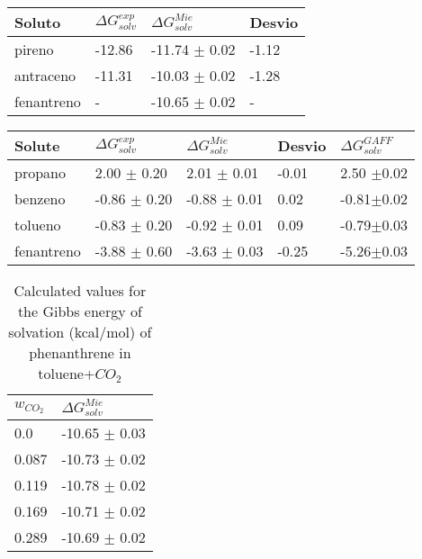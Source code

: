 \begin{table*}[h]
\center
  \label{tbl:solv1tes}
  \begin{tabular}{llll}
    \hline
     Soluto & $\Delta G_{solv}^{exp}$ & $\Delta G_{solv}^{Mie}$ & Desvio \\
    \hline
    pireno       & -12.86 & -11.74 $\pm$ 0.02 & -1.12\\
    antraceno   & -11.31 & -10.03 $\pm$ 0.02 & -1.28\\
    fenantreno   & - & -10.65 $\pm$ 0.02 & -\\
    \hline
  \end{tabular}

\end{table*}

\begin{table*}[h]
\center
  \label{tbl:solv2}
  \begin{tabular}{lllll}
    \hline
     Solute      & $\Delta G_{solv}^{exp}$ & $\Delta G_{solv}^{Mie}$ & Desvio &$\Delta G_{solv}^{GAFF}$ \\
    \hline
    propano      &  2.00 $\pm$ 0.20 & 2.01 $\pm$ 0.01& -0.01 &2.50 $\pm$0.02 \\
    benzeno      & -0.86 $\pm$ 0.20 & -0.88 $\pm$ 0.01    &  0.02    &-0.81$\pm$0.02 \\  
    tolueno      & -0.83 $\pm$ 0.20 & -0.92 $\pm$ 0.01   &  0.09    &-0.79$\pm$0.03\\
    fenantreno & -3.88 $\pm$ 0.60 & -3.63 $\pm$ 0.03& -0.25 &-5.26$\pm$0.03 \\
    \hline
  \end{tabular}
\end{table*}

\begin{table}[h]
\center
  \caption{Calculated values for the Gibbs energy of solvation (kcal/mol) of phenanthrene in toluene+$CO_{2}$}
  \label{tbl:solv3}
  \begin{tabular}{ll}
    \hline
      $w_{CO_{2}}$ & $\Delta G_{solv}^{Mie}$ \\
    \hline
    0.0    & -10.65 $\pm$ 0.03   \\
    0.087  & -10.73 $\pm$ 0.02   \\
    0.119  & -10.78 $\pm$ 0.02   \\
    0.169  & -10.71 $\pm$ 0.02   \\
    0.289  & -10.69 $\pm$ 0.02   \\
    \hline
  \end{tabular}

\end{table}

